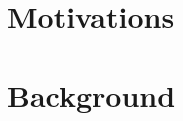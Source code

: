 
\chapter{Motivations}
\label{ch:motivations}


\chapter{Background}
\label{ch:background}
\bigskip
\begin{justify}
\end{justify}
\minitoc


